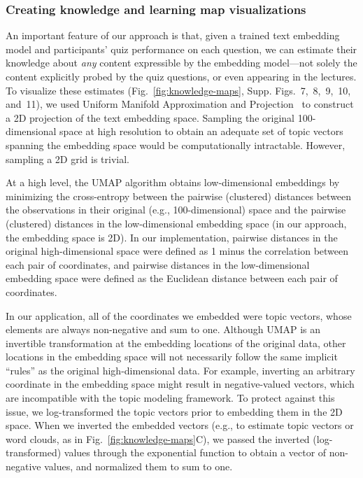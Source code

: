\documentclass[10pt]{article}
\newcommand{\individualKnowledgeMapsA}{7}
\newcommand{\individualKnowledgeMapsB}{8}
\newcommand{\individualKnowledgeMapsC}{9}
\newcommand{\individualLearningMapsA}{10}
\newcommand{\individualLearningMapsB}{11}
\begin{document}
\subsubsection*{Creating knowledge and learning map visualizations}\label{subsec:knowledge-maps}

An important feature of our approach is that, given a trained text embedding
model and participants' quiz performance on each question, we can estimate
their knowledge about \textit{any} content expressible by the embedding
model---not solely the content explicitly probed by the quiz questions, or even
appearing in the lectures. To visualize these estimates
(Fig.~\ref{fig:knowledge-maps}, Supp.
Figs.~\individualKnowledgeMapsA,~\individualKnowledgeMapsB,~\individualKnowledgeMapsC,~\individualLearningMapsA,
and~\individualLearningMapsB), we used Uniform Manifold Approximation and
Projection~\citep[UMAP; ][]{McInEtal18a, McInEtal18b} to construct a 2D
projection of the text embedding space. Sampling the original 100-dimensional
space at high resolution to obtain an adequate set of topic vectors spanning
the embedding space would be computationally intractable. However, sampling a
2D grid is trivial.

At a high level, the UMAP algorithm obtains low-dimensional embeddings by
minimizing the cross-entropy between the pairwise (clustered) distances between
the observations in their original (e.g., 100-dimensional) space and the
pairwise (clustered) distances in the low-dimensional embedding space (in our
approach, the embedding space is 2D). In our implementation, pairwise distances
in the original high-dimensional space were defined as 1 minus the correlation
between each pair of coordinates, and pairwise distances in the low-dimensional
embedding space were defined as the Euclidean distance between each pair of
coordinates.

In our application, all of the coordinates we embedded were topic vectors,
whose elements are always non-negative and sum to one. Although UMAP is an
invertible transformation at the embedding locations of the original data,
other locations in the embedding space will not necessarily follow the same
implicit ``rules'' as the original high-dimensional data. For example,
inverting an arbitrary coordinate in the embedding space might result in
negative-valued vectors, which are incompatible with the topic modeling
framework. To protect against this issue, we log-transformed the topic vectors
prior to embedding them in the 2D space. When we inverted the embedded vectors
(e.g., to estimate topic vectors or word clouds, as in
Fig.~\ref{fig:knowledge-maps}C), we passed the inverted (log-transformed)
values through the exponential function to obtain a vector of non-negative
values, and normalized them to sum to one.
\end{document}
